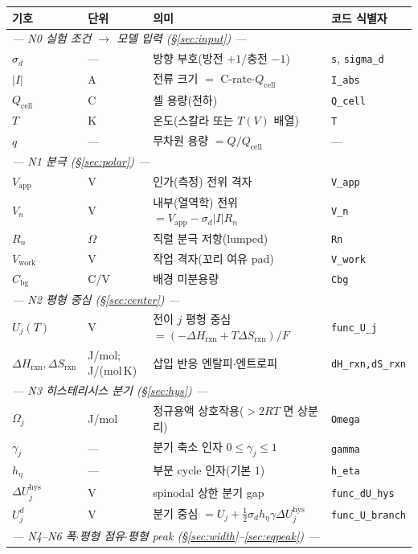 \documentclass[11pt,a4paper]{article}
\newcommand{\app}{\mathrm{app}}
\newcommand{\cell}{\mathrm{cell}}
\newcommand{\bg}{\mathrm{bg}}
\newcommand{\work}{\mathrm{work}}
\newcommand{\hys}{\mathrm{hys}}
\newcommand{\rxn}{\mathrm{rxn}}
\newcommand{\code}[1]{\texttt{#1}}
\begin{document}
\begin{longtable}{p{} p{} p{} p{}}
\toprule 기호 & 단위 & 의미 & 코드 식별자 \\ \midrule \endhead
\multicolumn{4}{l}{\emph{— N0 실험 조건 $\to$ 모델 입력 (§\ref{sec:input}) —}}\\
$\sigma_d$ & --- & 방향 부호(방전 $+1$/충전 $-1$) & \code{s}, \code{sigma\_d} \\
$|I|$ & A & 전류 크기 $=$ C-rate$\cdot Q_\cell$ & \code{I\_abs} \\
$Q_\cell$ & C & 셀 용량(전하) & \code{Q\_cell} \\
$T$ & K & 온도(스칼라 또는 $T(V)$ 배열) & \code{T} \\
$q$ & --- & 무차원 용량 $=Q/Q_\cell$ & --- \\
\multicolumn{4}{l}{\emph{— N1 분극 (§\ref{sec:polar}) —}}\\
$V_\app$ & V & 인가(측정) 전위 격자 & \code{V\_app} \\
$V_n$ & V & 내부(열역학) 전위 $=V_\app-\sigma_d|I|R_n$ & \code{V\_n} \\
$R_n$ & $\Omega$ & 직렬 분극 저항(lumped) & \code{Rn} \\
$V_\work$ & V & 작업 격자(꼬리 여유 pad) & \code{V\_work} \\
$C_\bg$ & C/V & 배경 미분용량 & \code{Cbg} \\
\multicolumn{4}{l}{\emph{— N2 평형 중심 (§\ref{sec:center}) —}}\\
$U_j(T)$ & V & 전이 $j$ 평형 중심 $=(-\Delta H_\rxn+T\Delta S_\rxn)/F$ & \code{func\_U\_j} \\
$\Delta H_\rxn,\Delta S_\rxn$ & {\footnotesize J/mol;\,J/(mol\,K)} & 삽입 반응 엔탈피$\cdot$엔트로피 & \code{dH\_rxn,dS\_rxn} \\
\multicolumn{4}{l}{\emph{— N3 히스테리시스 분기 (§\ref{sec:hys}) —}}\\
$\Omega_j$ & J/mol & 정규용액 상호작용($>2RT$ 면 상분리) & \code{Omega} \\
$\gamma_j$ & --- & 분기 축소 인자 $0\le\gamma_j\le1$ & \code{gamma} \\
$h_\eta$ & --- & 부분 cycle 인자(기본 $1$) & \code{h\_eta} \\
$\Delta U_j^\hys$ & V & spinodal 상한 분기 gap & \code{func\_dU\_hys} \\
$U_j^d$ & V & 분기 중심 $=U_j+\tfrac12\sigma_d h_\eta\gamma\Delta U_j^\hys$ & \code{func\_U\_branch} \\
\multicolumn{4}{l}{\emph{— N4--N6 폭$\cdot$평형 점유$\cdot$평형 peak (§\ref{sec:width}--\ref{sec:eqpeak}) —}}\\

\end{longtable}
\end{document}

